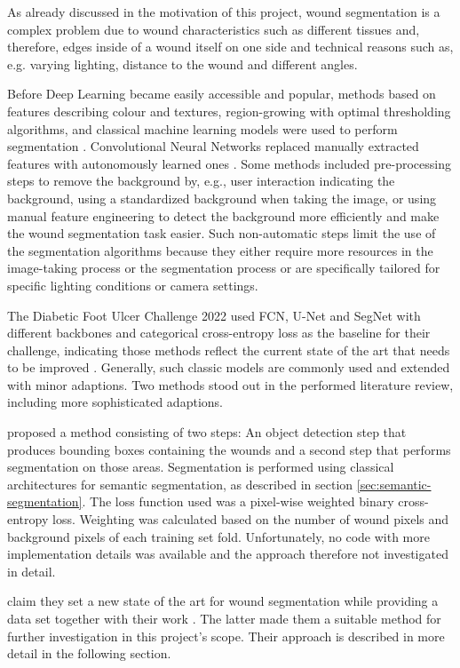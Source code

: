 As already discussed in the motivation of this project, wound segmentation is a complex problem due to wound characteristics such as different tissues and, therefore, edges inside of a wound itself on one side and technical reasons such as, e.g. varying lighting, distance to the wound and different angles. 

Before Deep Learning became easily accessible and popular, methods based on features describing colour and textures, region-growing with optimal thresholding algorithms, and classical machine learning models were used to perform segmentation \cite{Scebba2022}. Convolutional Neural Networks replaced manually extracted features with autonomously learned ones \cite{Scebba2022}. Some methods included pre-processing steps to remove the background by, e.g., user interaction indicating the background, using a standardized background when taking the image, or using manual feature engineering to detect the background more efficiently and make the wound segmentation task easier. Such non-automatic steps limit the use of the segmentation algorithms because they either require more resources in the image-taking process or the segmentation process or are specifically tailored for specific lighting conditions or camera settings.

The Diabetic Foot Ulcer Challenge 2022 used FCN, U-Net and SegNet with different backbones and categorical cross-entropy loss as the baseline for their challenge, indicating those methods reflect the current state of the art that needs to be improved \cite{DFUC2022}. Generally, such classic models are commonly used and extended with minor adaptions. Two methods stood out in the performed literature review, including more sophisticated adaptions.

\citeauthor{Scebba2022} proposed a method consisting of two steps: An object detection step that produces bounding boxes containing the wounds and a second step that performs segmentation on those areas. Segmentation is performed using classical architectures for semantic segmentation, as described in section \ref{sec:semantic-segmentation}. The loss function used was a pixel-wise weighted binary cross-entropy loss. Weighting was calculated based on the number of wound pixels and background pixels of each training set fold. Unfortunately, no code with more implementation details was available and the approach therefore not investigated in detail.

\citeauthor{Oota_2023_WACV} claim they set a new state of the art for wound segmentation while providing a data set together with their work \cite{Oota_2023_WACV}. The latter made them a suitable method for further investigation in this project's scope. Their approach is described in more detail in the following section.

